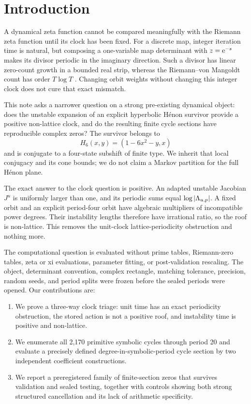 \section{Introduction}
\label{sec:introduction}

A dynamical zeta function cannot be compared meaningfully with the Riemann
zeta function until its clock has been fixed.  For a discrete map, integer
iteration time is natural, but composing a one-variable map determinant with
\(z=\mathrm{e}^{-s}\) makes its divisor periodic in the imaginary direction.  Such a
divisor has linear zero-count growth in a bounded real strip, whereas the
Riemann--von Mangoldt count has order \(T\log T\)
\citep{MontgomeryVaughan2007}.  Changing orbit weights without changing this
integer clock does not cure that exact mismatch.

This note asks a narrower question on a strong pre-existing dynamical object:
does the unstable expansion of an explicit hyperbolic H\'enon survivor provide
a positive non-lattice clock, and do the resulting finite cycle sections have
reproducible complex zeros?  The survivor belongs to
\[
  H_6(x,y)=(1-6x^2-y,x)
\]
and is conjugate to a four-state subshift of finite type.  We inherit that local
conjugacy and its cone bounds; we do not claim a Markov partition for the full
H\'enon plane.

The exact answer to the clock question is positive.  An adapted unstable
Jacobian \(J^u\) is uniformly larger than one, and its periodic sums equal
\(\log\left|\Lambda_{u,p}\right|\).  A fixed orbit and an explicit period-four orbit
have algebraic multipliers of incompatible power degrees.  Their instability
lengths therefore have irrational ratio, so the roof is non-lattice.  This
removes the unit-clock lattice-periodicity obstruction and nothing more.

The computational question is evaluated without prime tables, Riemann-zero
tables, zeta or xi evaluations, parameter fitting, or post-validation
rescaling.  The object, determinant convention, complex rectangle, matching
tolerance, precision, random seeds, and period splits were frozen before the
sealed periods were opened.  Our contributions are:
\begin{enumerate}
  \item We prove a three-way clock triage: unit time has an exact periodicity
  obstruction, the stored action is not a positive roof, and instability time
  is positive and non-lattice.
  \item We enumerate all 2,170 primitive symbolic cycles through period 20 and
  evaluate a precisely defined degree-in-symbolic-period cycle section by two
  independent coefficient constructions.
  \item We report a preregistered family of finite-section zeros that survives
  validation and sealed testing, together with controls showing both strong
  structured cancellation and its lack of arithmetic specificity.
\end{enumerate}

